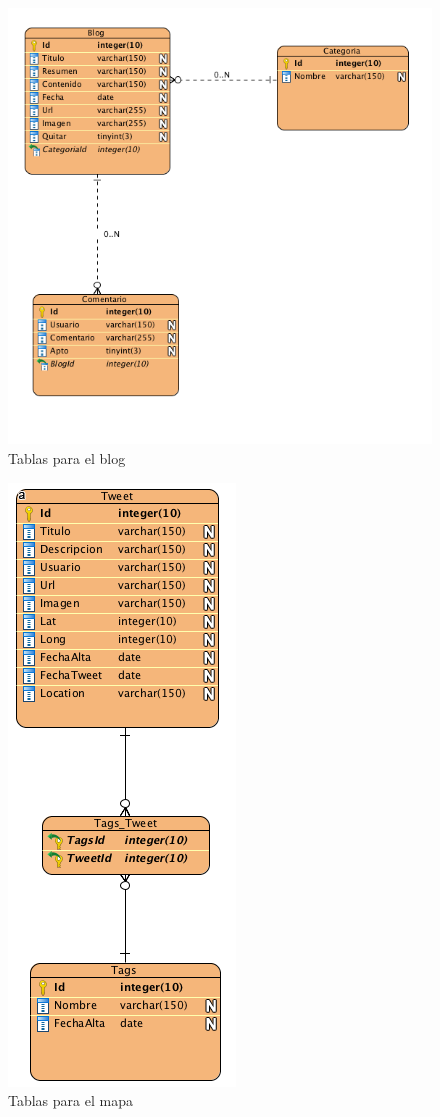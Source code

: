 \begin{figure}
\begin{center}
\includegraphics[scale=0.7]{imagenes/blog.png}
\caption{Tablas para el blog}
\label{blog_bd}
\end{center}
\end{figure}

\begin{figure}
\begin{center}
\includegraphics[scale=0.7]{imagenes/map.png}
\caption{Tablas para el mapa}
\label{map_bd}
\end{center}
\end{figure}


